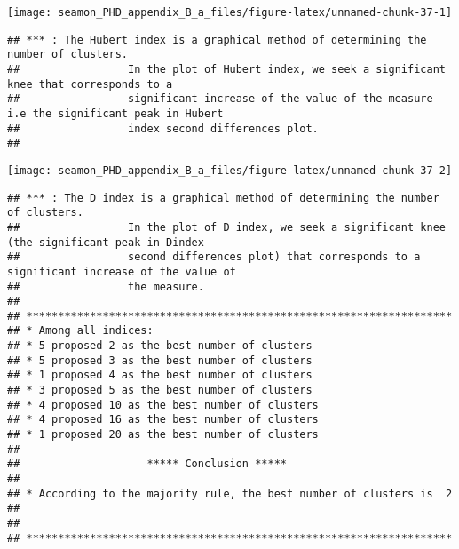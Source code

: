 \documentclass[]{article}
\newenvironment{Shaded}{\begin{snugshade}}{\end{snugshade}}
\newcommand{\CommentTok}[1]{\textcolor[rgb]{0.56,0.35,0.01}{\textit{#1}}}
\newcommand{\DataTypeTok}[1]{\textcolor[rgb]{0.13,0.29,0.53}{#1}}
\newcommand{\DecValTok}[1]{\textcolor[rgb]{0.00,0.00,0.81}{#1}}
\newcommand{\KeywordTok}[1]{\textcolor[rgb]{0.13,0.29,0.53}{\textbf{#1}}}
\newcommand{\NormalTok}[1]{#1}
\newcommand{\OperatorTok}[1]{\textcolor[rgb]{0.81,0.36,0.00}{\textbf{#1}}}
\newcommand{\OtherTok}[1]{\textcolor[rgb]{0.56,0.35,0.01}{#1}}
\newcommand{\StringTok}[1]{\textcolor[rgb]{0.31,0.60,0.02}{#1}}
\begin{document}
\begin{Shaded}
\end{Shaded}

\texttt{[image: seamon\_PHD\_appendix\_B\_a\_files/figure-latex/unnamed-chunk-37-1]}

\begin{verbatim}
## *** : The Hubert index is a graphical method of determining the number of clusters.
##                 In the plot of Hubert index, we seek a significant knee that corresponds to a 
##                 significant increase of the value of the measure i.e the significant peak in Hubert
##                 index second differences plot. 
## 
\end{verbatim}

\texttt{[image: seamon\_PHD\_appendix\_B\_a\_files/figure-latex/unnamed-chunk-37-2]}

\begin{verbatim}
## *** : The D index is a graphical method of determining the number of clusters. 
##                 In the plot of D index, we seek a significant knee (the significant peak in Dindex
##                 second differences plot) that corresponds to a significant increase of the value of
##                 the measure. 
##  
## ******************************************************************* 
## * Among all indices:                                                
## * 5 proposed 2 as the best number of clusters 
## * 5 proposed 3 as the best number of clusters 
## * 1 proposed 4 as the best number of clusters 
## * 3 proposed 5 as the best number of clusters 
## * 4 proposed 10 as the best number of clusters 
## * 4 proposed 16 as the best number of clusters 
## * 1 proposed 20 as the best number of clusters 
## 
##                    ***** Conclusion *****                            
##  
## * According to the majority rule, the best number of clusters is  2 
##  
##  
## *******************************************************************
\end{verbatim}
\end{document}
